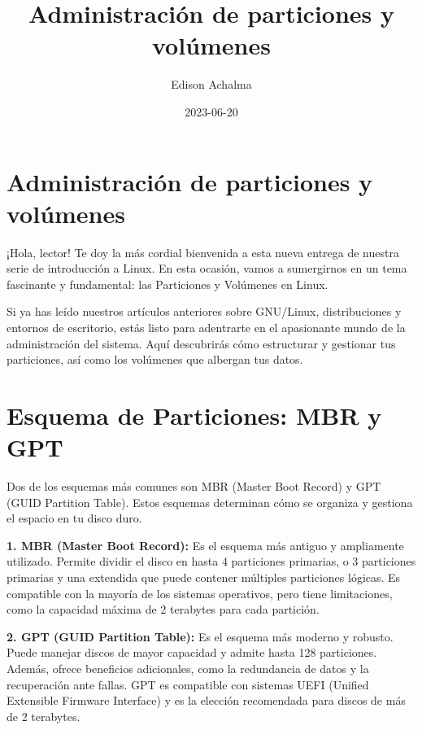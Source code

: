\documentclass[
  jou,
  floatsintext,
  longtable,
  a4paper,
  nolmodern,
  notxfonts,
  notimes,
  12pt,
  colorlinks=true,linkcolor=blue,citecolor=blue,urlcolor=blue]{apa7}
\title{Administración de particiones y volúmenes}
\author{Edison Achalma}
\affiliation{
{Escuela Profesional de Economía, Universidad Nacional de San Cristóbal
de Huamanga}}
\date{2023-06-20}
\begin{document}
\maketitle


\hypertarget{toc}{}
\tableofcontents
\newpage
\section[Introduction]{Administración de particiones y volúmenes}

\setcounter{secnumdepth}{3}

\setlength\LTleft{0pt}




¡Hola, lector! Te doy la más cordial bienvenida a esta nueva entrega de
nuestra serie de introducción a Linux. En esta ocasión, vamos a
sumergirnos en un tema fascinante y fundamental: las Particiones y
Volúmenes en Linux.

Si ya has leído nuestros artículos anteriores sobre GNU/Linux,
distribuciones y entornos de escritorio, estás listo para adentrarte en
el apasionante mundo de la administración del sistema. Aquí descubrirás
cómo estructurar y gestionar tus particiones, así como los volúmenes que
albergan tus datos.

\section{Esquema de Particiones: MBR y
GPT}\label{esquema-de-particiones-mbr-y-gpt}

Dos de los esquemas más comunes son MBR (Master Boot Record) y GPT (GUID
Partition Table). Estos esquemas determinan cómo se organiza y gestiona
el espacio en tu disco duro.

\textbf{1. MBR (Master Boot Record):} Es el esquema más antiguo y
ampliamente utilizado. Permite dividir el disco en hasta 4 particiones
primarias, o 3 particiones primarias y una extendida que puede contener
múltiples particiones lógicas. Es compatible con la mayoría de los
sistemas operativos, pero tiene limitaciones, como la capacidad máxima
de 2 terabytes para cada partición.

\textbf{2. GPT (GUID Partition Table):} Es el esquema más moderno y
robusto. Puede manejar discos de mayor capacidad y admite hasta 128
particiones. Además, ofrece beneficios adicionales, como la redundancia
de datos y la recuperación ante fallas. GPT es compatible con sistemas
UEFI (Unified Extensible Firmware Interface) y es la elección
recomendada para discos de más de 2 terabytes.
\end{document}

